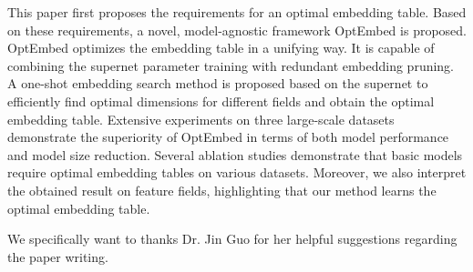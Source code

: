 \documentclass[sigconf]{acmart}
\begin{document}
This paper first proposes the requirements for an optimal embedding table. Based on these requirements, a novel, model-agnostic framework OptEmbed is proposed. OptEmbed optimizes the embedding table in a unifying way. It is capable of combining the supernet parameter training with redundant embedding pruning. A one-shot embedding search method is proposed based on the supernet to efficiently find optimal dimensions for different fields and obtain the optimal embedding table. Extensive experiments on three large-scale datasets demonstrate the superiority of OptEmbed in terms of both model performance and model size reduction. Several ablation studies demonstrate that basic models require optimal embedding tables on various datasets. Moreover, we also interpret the obtained result on feature fields, highlighting that our method learns the optimal embedding table.
 
\begin{acks} 
We specifically want to thanks Dr. Jin Guo for her helpful suggestions regarding the paper writing. 
\end{acks}

\clearpage
\normalem


\end{document}
